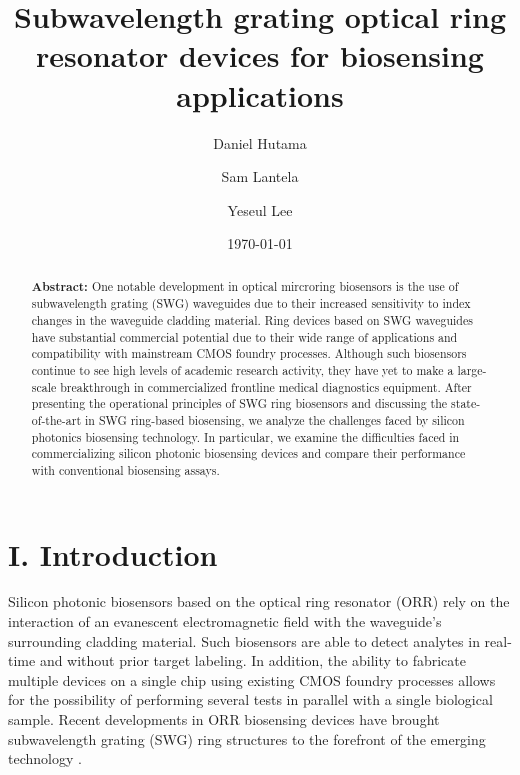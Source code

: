 \documentclass[aps,prl,twocolumn, superscriptaddress,nobalancelastpage]{revtex4}
\begin{document}
\title{Subwavelength grating optical ring resonator devices for biosensing applications} 



\author{Daniel Hutama}
\author{Sam Lantela}
\author{Yeseul Lee}

\date{\today}
\begin{abstract}
\noindent \textbf{Abstract:}  One notable development in optical mircroring biosensors is the use of subwavelength grating (SWG) waveguides due to their increased sensitivity to index changes in the waveguide cladding material.  Ring devices based on SWG waveguides have substantial commercial potential due to their wide range of applications and compatibility with mainstream CMOS foundry processes.  Although such biosensors continue to see high levels of academic research activity, they have yet to make a large-scale breakthrough in commercialized frontline medical diagnostics equipment.  After presenting the operational principles of SWG ring biosensors and discussing the state-of-the-art in SWG ring-based biosensing, we analyze the challenges faced by silicon photonics biosensing technology. In particular, we examine the difficulties faced in commercializing silicon photonic biosensing devices and compare their performance with conventional biosensing assays. 
\end{abstract}
\pacs{}
\maketitle

\section{I. Introduction}
\vspace{-1em}

Silicon photonic biosensors based on the optical ring resonator (ORR) rely on the interaction of an evanescent electromagnetic field with the waveguide's surrounding cladding material. Such biosensors are able to detect analytes in real-time and without prior target labeling. In addition, the ability to fabricate multiple devices on a single chip using existing CMOS foundry processes allows for the possibility of performing several tests in parallel with a single biological sample. Recent developments in ORR biosensing devices have brought subwavelength grating (SWG) ring structures to the forefront of the emerging technology \cite{swg1, swg2, labelfree}.
\end{document}
